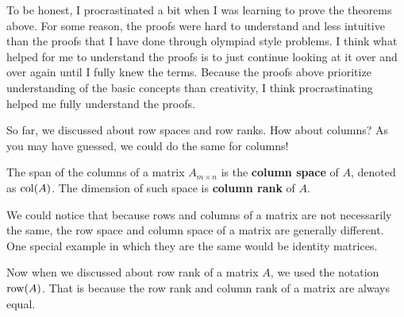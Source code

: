 \documentclass[../main.tex]{subfiles}
\begin{document}
To be honest, I procrastinated a bit when I was learning to prove
the theorems above. For some reason, the proofs were hard to
understand and less intuitive than the proofs that I have done
through olympiad style problems. I think what helped for me to
understand the proofs is to just continue looking at it over and
over again until I fully knew the terms. Because the proofs above
prioritize understanding of the basic concepts than creativity,
I think procrastinating helped me fully understand the proofs.

So far, we discussed about row spaces and row ranks. How about
columns? As you may have guessed, we could do the same for columns!

\begin{definition}
The span of the columns of a matrix $A_{m \times n}$ is the
\textbf{column space} of $A$, denoted as $\operatorname{col}(A)$. The dimension
of such space is \textbf{column rank} of $A$.
\end{definition}

We could notice that because rows and columns of a matrix are not
necessarily the same, the row space and column space of a
matrix are generally different. One special example in which they
are the same would be identity matrices.

Now when we discussed about row rank of a matrix $A$, we used the
notation $\operatorname{row}(A)$. That is because the row rank and column rank
of a matrix are always equal.
\end{document}
